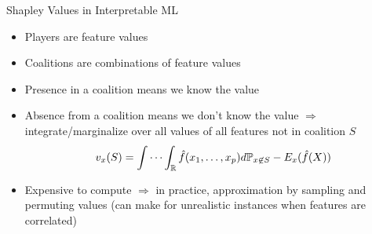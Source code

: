 \documentclass[ignorenonframetext,xcolor=x11names]{beamer}
\begin{document}
\begin{frame}{Shapley Values in Interpretable ML}
\begin{itemize}
   \item Players are feature values
   \item Coalitions are combinations of feature values
   \item Presence in a coalition means we know the value
   \item Absence from a coalition means we don't know the value $\Rightarrow$ integrate/marginalize over all values of all features not in coalition $S$
   \begin{align*}
   v_x(S) = \idotsint_\Bbb{R} \hat{f}(x_1, \ldots, x_p) d\Bbb{P}_{x \not\in S} - E_x(\hat{f}(X))
   \end{align*}
   \item Expensive to compute $\Rightarrow$ in practice, approximation by sampling and permuting values (can make for unrealistic instances when features are correlated)
\end{itemize}
\end{frame}
\end{document}
